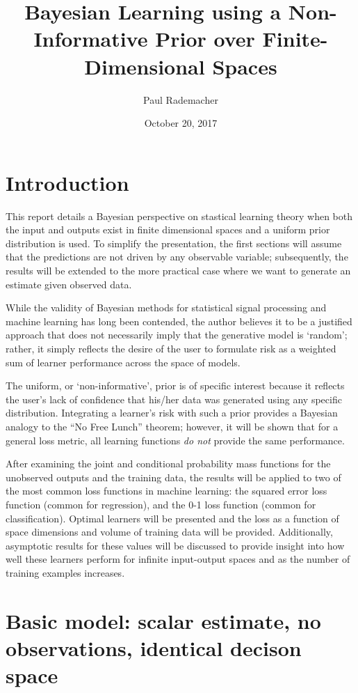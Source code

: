 \documentclass[12pt]{article}
\title{Bayesian Learning using a Non-Informative Prior over Finite-Dimensional Spaces}
\author{Paul Rademacher}
\date{October 20, 2017}
\begin{document}
\maketitle




\section{Introduction}

This report details a Bayesian perspective on stastical learning theory when both the input and outputs exist in finite dimensional spaces and a uniform prior distribution is used. To simplify the presentation, the first sections will assume that the predictions are not driven by any observable variable; subsequently, the results will be extended to the more practical case where we want to generate an estimate given observed data.

While the validity of Bayesian methods for statistical signal processing and machine learning has long been contended, the author believes it to be a justified approach that does not necessarily imply that the generative model is `random'; rather, it simply reflects the desire of the user to formulate risk as a weighted sum of learner performance across the space of models. 

The uniform, or `non-informative', prior is of specific interest because it reflects the user's lack of confidence that his/her data was generated using any specific distribution. Integrating a learner's risk with such a prior provides a Bayesian analogy to the ``No Free Lunch'' theorem; however, it will be shown that for a general loss metric, all learning functions \emph{do not} provide the same performance.

After examining the joint and conditional probability mass functions for the unobserved outputs and the training data, the results will be applied to two of the most common loss functions in machine learning: the squared error loss function (common for regression), and the 0-1 loss function (common for classification). Optimal learners will be presented and the loss as a function of space dimensions and volume of training data will be provided. Additionally, asymptotic results for these values will be discussed to provide insight into how well these learners perform for infinite input-output spaces and as the number of training examples increases. 




\section{Basic model: scalar estimate, no observations, identical decison space}
\end{document}
